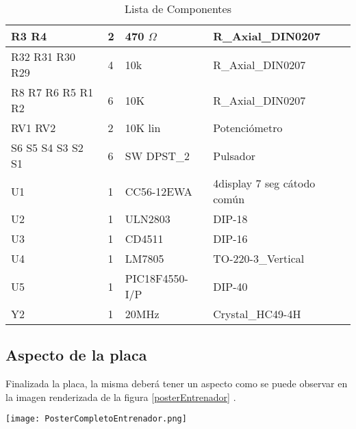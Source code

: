 \begin{table}[htb]
\begin{tabular}{|p{}|p{}|p{}|p{}|}
		R3 R4 & 2 & 470 $\Omega$ & R\_Axial\_DIN0207 \\ \hline
		R32 R31 R30 R29 & 4 & 10k & R\_Axial\_DIN0207 \\ \hline
		R8 R7 R6 R5 R1 R2 & 6 & 10K & R\_Axial\_DIN0207 \\ \hline
		RV1 RV2 & 2 & 10K lin & Potenciómetro \\ \hline
		S6 S5 S4 S3 S2 S1 & 6 & SW DPST\_2 & Pulsador \\ \hline
		U1 & 1 & CC56-12EWA & 4display 7 seg cátodo común \\ \hline
		U2 & 1 & ULN2803 & DIP-18 \\ \hline
		U3 & 1 & CD4511 & DIP-16 \\ \hline
		U4 & 1 & LM7805 & TO-220-3\_Vertical \\ \hline
		U5 & 1 & PIC18F4550-I/P & DIP-40 \\ \hline
		Y2 & 1 & 20MHz & Crystal\_HC49-4H \\ \hline
	\end{tabular}
	\caption{Lista de Componentes}
	\label{ListaComponentes}
\end{table}
\pagebreak%
\subsection{Aspecto de la placa}
Finalizada la placa, la misma deberá tener un aspecto como se puede observar en la imagen renderizada de la figura \ref{posterEntrenador} . 
\begin{sidewaysfigure}[htb]

	\centering\texttt{[image: PosterCompletoEntrenador.png]}

	\caption{Vista superior de la placa base}\label{posterEntrenador}
\end{sidewaysfigure}



	





